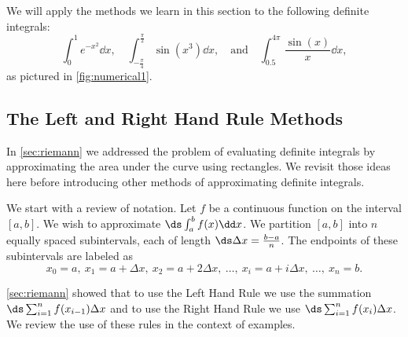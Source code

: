 We will apply the methods we learn in this section to the following definite integrals:\vspace{-.5\baselineskip}
\[
 \int_0^1 e^{-x^2}\dd x, \quad
 \int_{-\frac{\pi}{4}}^{\frac{\pi}{2}} \sin(x^3)\dd x,
 \quad \text{and} \quad
 \int_{0.5}^{4\pi} \frac{\sin(x)}{x}\dd x,
\]
as pictured in \autoref{fig:numerical1}.

\subsection{The Left and Right Hand Rule Methods}

In \autoref{sec:riemann} we addressed the problem of evaluating definite integrals by approximating the area under the curve using rectangles. We revisit those ideas here before introducing other methods of approximating definite integrals. 

We start with a review of notation. Let $f$ be a continuous function on the interval $[a,b]$. We wish to approximate $\ds \int_a^b f(x)\dd x$. We partition $[a,b]$ into $n$ equally spaced subintervals, each of length $\ds\Delta x = \frac{b-a}{n}$. The endpoints of these subintervals are labeled as
\[x_0=a,\ x_1 = a+\Delta x,\ x_2 = a+ 2\Delta x,\ \dotsc,\ x_i = a+i\Delta x,\ \dotsc,\ x_n = b.\]

\autoref{sec:riemann} showed that to use the Left Hand Rule we use the summation $\ds \sum_{i=1}^n f(x_{i-1})\Delta x$ and to use the Right Hand Rule we use $\ds \sum_{i=1}^n f(x_i)\Delta x$. We review the use of these rules in the context of examples.

